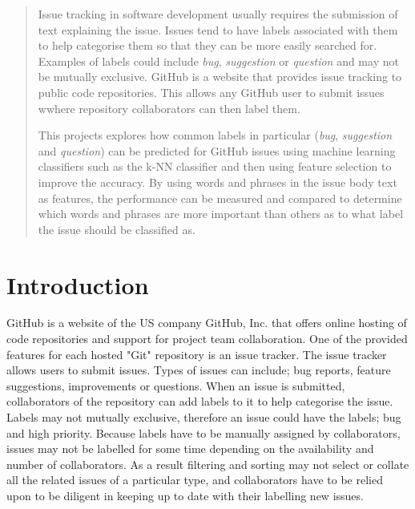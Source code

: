 \newcommand{\todo}[1]{
	\colorbox{light-gray}{
		\parbox{\linewidth}{
			\textbf{TODO} #1
		}
	}
}

\begin{abstract} 
Issue tracking in software development usually requires the submission of text explaining the issue. Issues tend to have labels
associated with them to help categorise them so that they can be more easily searched for. Examples of labels could include
\textit{bug}, \textit{suggestion} or \textit{question} and may not be mutually exclusive. GitHub is a website that provides
issue tracking to public code repositories. This allows any GitHub user to submit issues wwhere repository collaborators can
then label them.

This projects explores how common labels in particular (\textit{bug}, \textit{suggestion} and \textit{question}) can be
predicted for GitHub issues using machine learning classifiers such as the k-NN classifier and then using feature selection to
improve the accuracy. By using words and phrases in the issue body text as features, the performance can be measured and
compared to determine which words and phrases are more important than others as to what label the issue should be classified as.
\end{abstract}

\section{Introduction}
GitHub is a website of the US company GitHub, Inc. that offers online hosting of code repositories and support for project team
collaboration. One of the provided features for each hosted "Git" repository is an issue tracker. The issue tracker allows users
to submit issues. Types of issues can include; bug reports, feature suggestions, improvements or questions. When an issue is
submitted, collaborators of the repository can add labels to it to help categorise the issue. Labels may not mutually exclusive,
therefore an issue could have the labels; bug and high priority. Because labels have to be manually assigned by collaborators,
issues may not be labelled for some time depending on the availability and number of collaborators. As a result filtering and
sorting may not select or collate all the related issues of a particular type, and collaborators have to be relied upon to be
diligent in keeping up to date with their labelling new issues.

